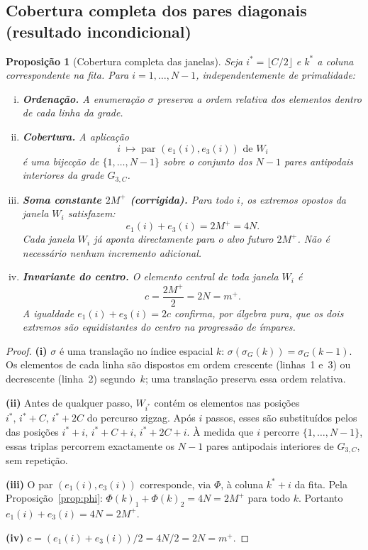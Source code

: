 \documentclass[12pt, a4paper]{article}
\theoremstyle{plain}
\newtheorem{proposition}[theorem]{Proposição}
\theoremstyle{definition}
\theoremstyle{remark}
\begin{document}
	\subsection{Cobertura completa dos pares diagonais
		(resultado incondicional)}
	
	\begin{proposition}[Cobertura completa das janelas]
		\label{prop:orbita}
		Seja $i^*=\lfloor C/2\rfloor$ e $k^*$ a coluna correspondente
		na fita.  Para $i=1,\ldots,N-1$, independentemente de primalidade:
		\begin{enumerate}[(i)]
			\item \textbf{Ordenação.}  A enumeração $\sigma$ preserva a
			ordem relativa dos elementos dentro de cada linha da grade.
			\item \textbf{Cobertura.}  A aplicação
			\[
			i \;\mapsto\;
			\text{par }(e_1(i),e_3(i))\text{ de }W_i
			\]
			é uma bijecção de $\{1,\ldots,N-1\}$ sobre o conjunto
			dos $N-1$ pares antipodais interiores da grade $G_{3,C}$.
			\item \textbf{Soma constante $2M^+$ (corrigida).}  Para
			todo $i$, os extremos opostos da janela $W_i$ satisfazem:
			\[
			e_1(i) + e_3(i) = 2M^+ = 4N.
			\]
			Cada janela $W_i$ já aponta directamente para o alvo
			futuro $2M^+$.  Não é necessário nenhum incremento adicional.
			\item \textbf{Invariante do centro.}  O elemento central de
			toda janela $W_i$ é
			\[
			c = \frac{2M^+}{2} = 2N = m^+.
			\]
			A igualdade $e_1(i)+e_3(i) = 2c$ confirma, por álgebra
			pura, que os dois extremos são equidistantes do centro na
			progressão de ímpares.
		\end{enumerate}
	\end{proposition}
	
	\begin{proof}
		\textbf{(i)}  $\sigma$ é uma translação no índice espacial $k$:
		$\sigma(\sigma_G(k))=\sigma_G(k-1)$.  Os elementos de cada linha
		são dispostos em ordem crescente (linhas~1 e~3) ou decrescente
		(linha~2) segundo~$k$; uma translação preserva essa ordem relativa.
		
		\textbf{(ii)}  Antes de qualquer passo, $W_{i^*}$ contém os
		elementos nas posições $i^*,\,i^*+C,\,i^*+2C$ do percurso zigzag.
		Após $i$ passos, esses são substituídos pelos das posições
		$i^*+i,\,i^*+C+i,\,i^*+2C+i$.  À medida que $i$ percorre
		$\{1,\ldots,N-1\}$, essas triplas percorrem exactamente os $N-1$
		pares antipodais interiores de $G_{3,C}$, sem repetição.
		
		\textbf{(iii)}  O par $(e_1(i),e_3(i))$ corresponde, via $\Phi$,
		à coluna $k^*+i$ da fita.  Pela Proposição~\ref{prop:phi}:
		$\Phi(k)_1+\Phi(k)_2 = 4N = 2M^+$ para todo $k$. Portanto
		$e_1(i)+e_3(i) = 4N = 2M^+$.
		
		\textbf{(iv)}  $c = (e_1(i)+e_3(i))/2 = 4N/2 = 2N = m^+$.
	\end{proof}
	
\end{document}
